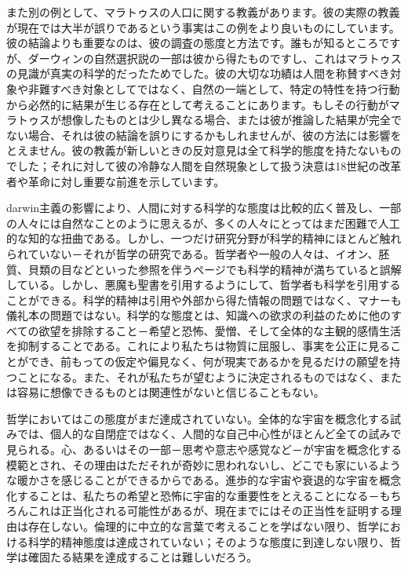 \documentclass[a4paper,11pt,openany]{ltjsbook}
\begin{document}
また別の例として、マラトゥスの人口に関する教義があります。彼の実際の教義が現在では大半が誤りであるという事実はこの例をより良いものにしています。彼の結論よりも重要なのは、彼の調査の態度と方法です。誰もが知るところですが、ダーウィンの自然選択説の一部は彼から得たものですし、これはマラトゥスの見識が真実の科学的だったためでした。彼の大切な功績は人間を称賛すべき対象や非難すべき対象としてではなく、自然の一端として、特定の特性を持つ行動から必然的に結果が生じる存在として考えることにあります。もしその行動がマラトゥスが想像したものとは少し異なる場合、または彼が推論した結果が完全でない場合、それは彼の結論を誤りにするかもしれませんが、彼の方法には影響をとえません。彼の教義が新しいときの反対意見は全て科学的態度を持たないものでした；それに対して彼の冷静な人間を自然現象として扱う決意は18世紀の改革者や革命に対し重要な前進を示しています。

darwin主義の影響により、人間に対する科学的な態度は比較的広く普及し、一部の人々には自然なことのように思えるが、多くの人々にとってはまだ困難で人工的な知的な扭曲である。しかし、一つだけ研究分野が科学的精神にほとんど触れられていない－それが哲学の研究である。哲学者や一般の人々は、イオン、胚質、貝類の目などといった参照を伴うページでも科学的精神が満ちていると誤解している。しかし、悪魔も聖書を引用するようにして、哲学者も科学を引用することができる。科学的精神は引用や外部から得た情報の問題ではなく、マナーも儀礼本の問題ではない。科学的な態度とは、知識への欲求の利益のために他のすべての欲望を排除すること－希望と恐怖、愛憎、そして全体的な主観的感情生活を抑制することである。これにより私たちは物質に屈服し、事実を公正に見ることができ、前もっての仮定や偏見なく、何が現実であるかを見るだけの願望を持つことになる。また、それが私たちが望むように決定されるものではなく、または容易に想像できるものとは関連性がないと信じることもない。

哲学においてはこの態度がまだ達成されていない。全体的な宇宙を概念化する試みでは、個人的な自閉症ではなく、人間的な自己中心性がほとんど全ての試みで見られる。心、あるいはその一部－思考や意志や感覚など－が宇宙を概念化する模範とされ、その理由はただそれが奇妙に思われないし、どこでも家にいるような暖かさを感じることができるからである。進歩的な宇宙や衰退的な宇宙を概念化することは、私たちの希望と恐怖に宇宙的な重要性をとえることになる－もちろんこれは正当化される可能性があるが、現在までにはその正当性を証明する理由は存在しない。倫理的に中立的な言葉で考えることを学ばない限り、哲学における科学的精神態度は達成されていない；そのような態度に到達しない限り、哲学は確固たる結果を達成することは難しいだろう。
\end{document}
